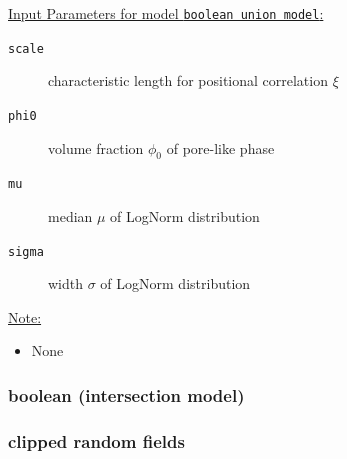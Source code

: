 \uline{Input Parameters for model \texttt{boolean union model}:}\\
\begin{description}
\item[\texttt{scale}] characteristic length for positional correlation $\xi$
\item[\texttt{phi0}] volume fraction $\phi_0$ of pore-like phase
\item[\texttt{mu}] median $\mu$ of LogNorm distribution
\item[\texttt{sigma}] width $\sigma$ of LogNorm distribution
\end{description}

\vspace{5mm}

\uline{Note:}
\begin{itemize}
\item None
\end{itemize}

\newpage
\subsubsection{boolean (intersection model)}

\newpage
\subsubsection{clipped random fields} ~\\

